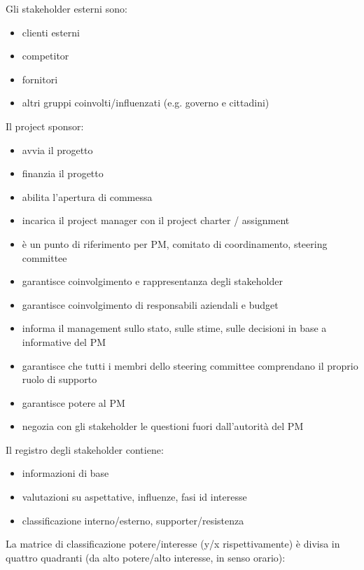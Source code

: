 \documentclass[answers, a4paper, 11pt]{exam}
\begin{document}
Gli stakeholder esterni sono:

\begin{itemize}
    \item clienti esterni
    \item competitor
    \item fornitori
    \item altri gruppi coinvolti/influenzati (e.g. governo e cittadini)
\end{itemize}

Il project sponsor:

\begin{itemize}
    \item avvia il progetto
    \item finanzia il progetto
    \item abilita l'apertura di commessa
    \item incarica il project manager con il project charter / assignment
    \item è un punto di riferimento per PM, comitato di coordinamento, steering committee
    \item garantisce coinvolgimento e rappresentanza degli stakeholder
    \item garantisce coinvolgimento di responsabili aziendali e budget
    \item informa il management sullo stato, sulle stime, sulle decisioni in base a informative del PM
    \item garantisce che tutti i membri dello steering committee comprendano il proprio ruolo di supporto
    \item garantisce potere al PM
    \item negozia con gli stakeholder le questioni fuori dall'autorità del PM
\end{itemize}

Il registro degli stakeholder contiene:

\begin{itemize}
    \item informazioni di base
    \item valutazioni su aspettative, influenze, fasi id interesse
    \item classificazione interno/esterno, supporter/resistenza
\end{itemize}

La matrice di classificazione potere/interesse (y/x rispettivamente) è divisa in quattro quadranti (da alto potere/alto interesse, in senso orario):
\end{document}
